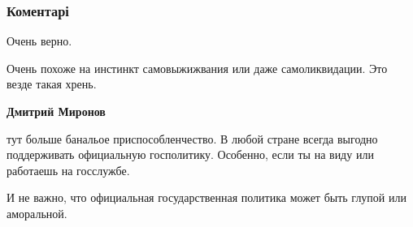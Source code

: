  
 
 
 
 
\subsubsection{Коментарі}
\label{sec:01_08_2021.fb.lesto_andrej.1.vna_ukraine_mova.cmt}

\begin{itemize}
 
Очень верно.

 
Очень похоже на инстинкт самовыжижвания или даже самоликвидации. Это везде такая хрень.

\begin{itemize}
 
\textbf{Дмитрий Миронов} 

тут больше банальое приспособленчество. В любой стране всегда выгодно
поддерживать официальную госполитику. Особенно, если ты на виду или работаешь
на госслужбе.

И не важно, что официальная государственная политика может быть глупой или
аморальной.


 

\end{itemize}
\end{itemize}
